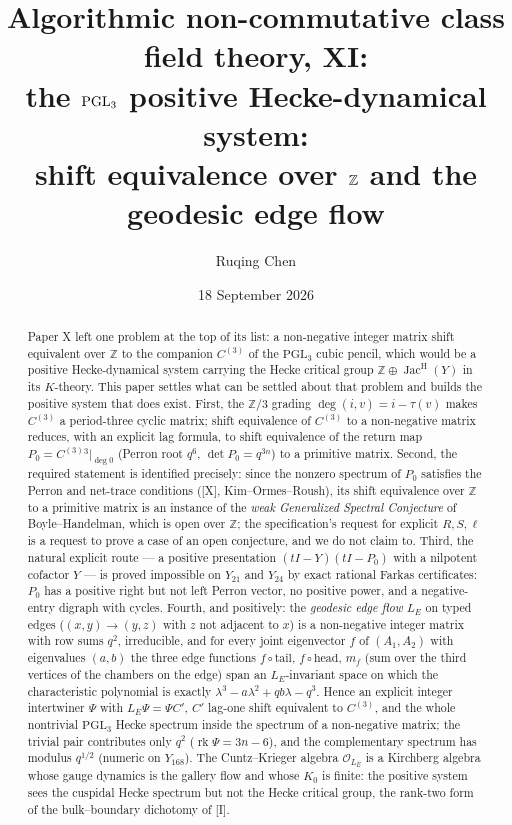 \documentclass[11pt]{amsart}
\title[Algorithmic non-commutative class field theory, XI]
{Algorithmic non-commutative class field theory, XI:\\
the $\PGL_3$ positive Hecke-dynamical system:\\ shift equivalence over $\Z$ and the geodesic
edge flow}
\author{Ruqing Chen}
\date{18 September 2026}
\numberwithin{equation}{section}
\theoremstyle{definition}
\theoremstyle{remark}
\newcommand{\Z}{\mathbb{Z}}
\newcommand{\cO}{\mathcal{O}}
\newcommand{\Jac}{\operatorname{Jac}}
\newcommand{\rk}{\operatorname{rk}}
\newcommand{\PGL}{\mathrm{PGL}}
\newcommand{\JacH}{\Jac^{\mathrm{H}}}
\newcommand{\Cthree}{C^{(3)}}
\newcommand{\LE}{L_{E}}
\begin{document}
\begin{abstract}
Paper X left one problem at the top of its list: a non-negative integer matrix shift
equivalent over $\Z$ to the companion $\Cthree$ of the $\PGL_3$ cubic pencil, which would be
a positive Hecke-dynamical system carrying the Hecke critical group $\Z\oplus\JacH(Y)$ in its
$K$-theory. This paper settles what can be settled about that problem and builds the
positive system that does exist. First, the $\Z/3$ grading $\deg(i,v)=i-\tau(v)$ makes
$\Cthree$ a period-three cyclic matrix; shift equivalence of $\Cthree$ to a non-negative
matrix reduces, with an explicit lag formula, to shift equivalence of the return map
$P_0=\Cthree{}^{3}|_{\deg 0}$ (Perron root $q^{6}$, $\det P_0=q^{3n}$) to a primitive matrix.
Second, the required statement is identified precisely: since the nonzero spectrum of $P_0$
satisfies the Perron and net-trace conditions ([X], Kim--Ormes--Roush), its shift
equivalence over $\Z$ to a primitive matrix is an instance of the \emph{weak Generalized
Spectral Conjecture} of Boyle--Handelman, which is open over $\Z$; the specification's
request for explicit $R,S,\ell$ is a request to prove a case of an open conjecture, and we
do not claim to. Third, the natural explicit route --- a positive presentation
$(tI-Y)(tI-P_0)$ with a nilpotent cofactor $Y$ --- is proved impossible on $Y_{21}$ and
$Y_{24}$ by exact rational Farkas certificates: $P_0$ has a positive right but not left
Perron vector, no positive power, and a negative-entry digraph with cycles. Fourth, and
positively: the \emph{geodesic edge flow} $\LE$ on typed edges ($(x,y)\to(y,z)$ with $z$ not
adjacent to $x$) is a non-negative integer matrix with row sums $q^{2}$, irreducible, and for
every joint eigenvector $f$ of $(A_1,A_2)$ with eigenvalues $(a,b)$ the three edge functions
$f\circ\text{tail}$, $f\circ\text{head}$, $m_f$ (sum over the third vertices of the chambers on
the edge) span an $\LE$-invariant space on which the characteristic polynomial is exactly
$\lambda^{3}-a\lambda^{2}+qb\lambda-q^{3}$. Hence an explicit integer intertwiner $\Psi$ with
$\LE\Psi=\Psi C'$, $C'$ lag-one shift equivalent to $\Cthree$, and the whole nontrivial
$\PGL_3$ Hecke spectrum inside the spectrum of a non-negative matrix; the trivial pair
contributes only $q^{2}$ ($\rk\Psi=3n-6$), and the complementary spectrum has modulus
$q^{1/2}$ (numeric on $Y_{168}$). The Cuntz--Krieger algebra $\cO_{\LE}$ is a Kirchberg
algebra whose gauge dynamics is the gallery flow and whose $K_0$ is finite: the positive
system sees the cuspidal Hecke spectrum but not the Hecke critical group, the rank-two form
of the bulk--boundary dichotomy of [I].
\end{abstract}
\end{document}
